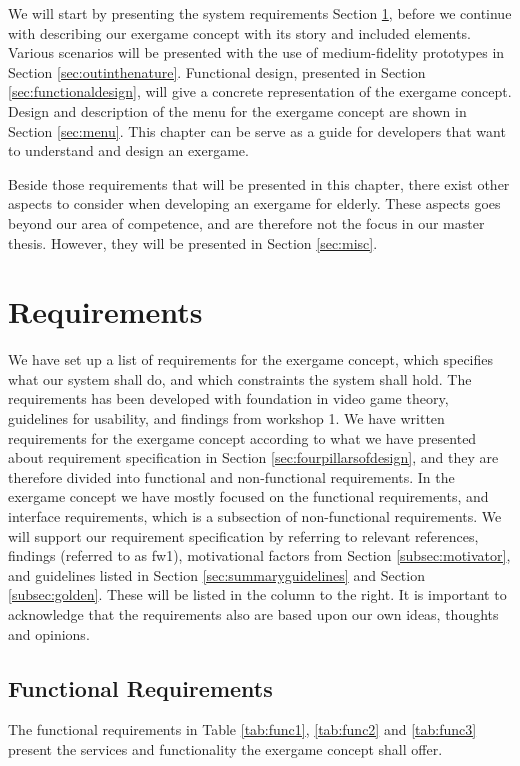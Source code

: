 We will start by presenting the system requirements Section \ref{sec:req}, before we continue with describing our exergame concept with its story and included elements. Various scenarios will be presented with the use of medium-fidelity prototypes in Section \ref{sec:outinthenature}. Functional design, presented in Section \ref{sec:functionaldesign}, will give a concrete representation of the exergame concept. Design and description of the menu for the exergame concept are shown in Section \ref{sec:menu}. This chapter can be serve as a guide for developers that want to understand and design an exergame. 

Beside those requirements that will be presented in this chapter, there exist other aspects to consider when developing an exergame for elderly. These aspects goes beyond our area of competence, and are therefore not the focus in our master thesis. However, they will be presented in Section \ref{sec:misc}.

\section{Requirements}
\label{sec:req}
We have set up a list of requirements for the exergame concept, which specifies what our system shall do, and which constraints the system shall hold. The requirements has been developed with foundation in video game theory, guidelines for usability, and findings from workshop 1. We have written requirements for the exergame concept according to what we have presented about requirement specification in Section \ref{sec:fourpillarsofdesign}, and they are therefore divided into functional and non-functional requirements. In the exergame concept we have mostly focused on the functional requirements, and interface requirements, which is a subsection of non-functional requirements. We will support our requirement specification by referring to relevant references, findings (referred to as fw1), motivational factors from Section \ref{subsec:motivator}, and guidelines listed in Section \ref{sec:summaryguidelines} and Section \ref{subsec:golden}. These will be listed in the column to the right. It is important to acknowledge that the requirements also are based upon our own ideas, thoughts and opinions. 

\subsection{Functional Requirements}
The functional requirements in Table \ref{tab:func1}, \ref{tab:func2} and \ref{tab:func3} present the services and functionality the exergame concept shall offer.

